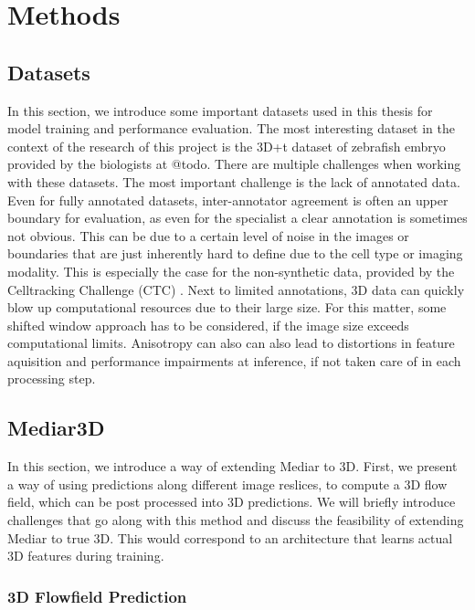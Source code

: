\chapter{Methods}

\section{Datasets}
In this section, we introduce some important datasets used in this thesis for model training and performance evaluation. The most interesting dataset in the context of the research of this project is the 3D+t dataset of zebrafish embryo provided by the biologists at @todo.
There are multiple challenges when working with these datasets. The most important challenge is the lack of annotated data. Even for fully annotated datasets, inter-annotator agreement is often an upper boundary for evaluation, as even for the specialist a clear annotation is sometimes not obvious. This can be due to a certain level of noise in the images or boundaries that are just inherently hard to define due to the cell type or imaging modality. This is especially the case for the non-synthetic data, provided by the Celltracking Challenge (CTC) \cite{ctc}. Next to limited annotations, 3D data can quickly blow up computational resources due to their large size. For this matter, some shifted window approach has to be considered, if the image size exceeds computational limits. Anisotropy can also can also lead to distortions in feature aquisition and performance impairments at inference, if not taken care of in each processing step. 
\section{Mediar3D}

In this section, we introduce a way of extending Mediar to 3D. First, we present a way of using predictions along different image reslices, to compute a 3D flow field, which can be post processed into 3D predictions. We will briefly introduce challenges that go along with this method and discuss the feasibility of extending Mediar to true 3D. This would correspond to an architecture that learns actual 3D features during training.

\subsection{3D Flowfield Prediction}

